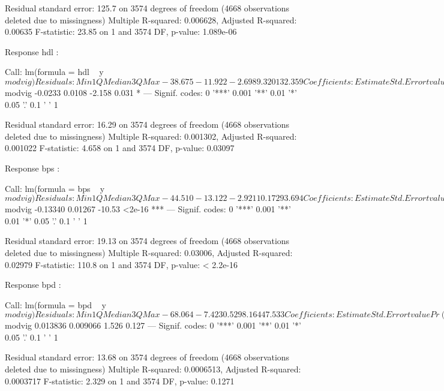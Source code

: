 \documentclass[11pt]{article}
\begin{document}
\begin{Schunk}
\begin{Soutput}
Residual standard error: 125.7 on 3574 degrees of freedom
  (4668 observations deleted due to missingness)
Multiple R-squared:  0.006628,	Adjusted R-squared:  0.00635 
F-statistic: 23.85 on 1 and 3574 DF,  p-value: 1.089e-06


Response hdl :

Call:
lm(formula = hdl ~ y$modvig)

Residuals:
    Min      1Q  Median      3Q     Max 
-38.675 -11.922  -2.698   9.320 132.359 

Coefficients:
            Estimate Std. Error t value Pr(>|t|)    
(Intercept)  55.6949     0.3695 150.740   <2e-16 ***
y$modvig     -0.0233     0.0108  -2.158    0.031 *  
---
Signif. codes:  0 '***' 0.001 '**' 0.01 '*' 0.05 '.' 0.1 ' ' 1

Residual standard error: 16.29 on 3574 degrees of freedom
  (4668 observations deleted due to missingness)
Multiple R-squared:  0.001302,	Adjusted R-squared:  0.001022 
F-statistic: 4.658 on 1 and 3574 DF,  p-value: 0.03097


Response bps :

Call:
lm(formula = bps ~ y$modvig)

Residuals:
    Min      1Q  Median      3Q     Max 
-44.510 -13.122  -2.921  10.172  93.694 

Coefficients:
             Estimate Std. Error t value Pr(>|t|)    
(Intercept) 126.33975    0.43377  291.26   <2e-16 ***
y$modvig     -0.13340    0.01267  -10.53   <2e-16 ***
---
Signif. codes:  0 '***' 0.001 '**' 0.01 '*' 0.05 '.' 0.1 ' ' 1

Residual standard error: 19.13 on 3574 degrees of freedom
  (4668 observations deleted due to missingness)
Multiple R-squared:  0.03006,	Adjusted R-squared:  0.02979 
F-statistic: 110.8 on 1 and 3574 DF,  p-value: < 2.2e-16


Response bpd :

Call:
lm(formula = bpd ~ y$modvig)

Residuals:
    Min      1Q  Median      3Q     Max 
-68.064  -7.423   0.529   8.164  47.533 

Coefficients:
             Estimate Std. Error t value Pr(>|t|)    
(Intercept) 67.729506   0.310267 218.294   <2e-16 ***
y$modvig     0.013836   0.009066   1.526    0.127    
---
Signif. codes:  0 '***' 0.001 '**' 0.01 '*' 0.05 '.' 0.1 ' ' 1

Residual standard error: 13.68 on 3574 degrees of freedom
  (4668 observations deleted due to missingness)
Multiple R-squared:  0.0006513,	Adjusted R-squared:  0.0003717 
F-statistic: 2.329 on 1 and 3574 DF,  p-value: 0.1271
\end{Soutput}
\end{Schunk}
\end{document}
